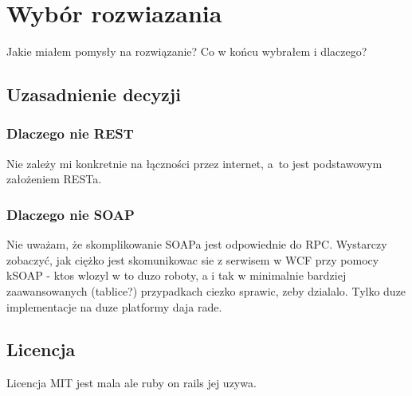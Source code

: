 \section{Wybór rozwiazania}
Jakie miałem pomysły na rozwiązanie? Co w końcu wybrałem i dlaczego?

\subsection{Uzasadnienie decyzji}
\subsubsection{Dlaczego nie REST}
Nie zależy mi konkretnie na łączności przez internet, a~to jest podstawowym założeniem RESTa.

\subsubsection{Dlaczego nie SOAP}
Nie uważam, że skomplikowanie SOAPa jest odpowiednie do RPC. Wystarczy zobaczyć, jak ciężko jest skomunikowac sie z serwisem w WCF przy pomocy kSOAP - ktos wlozyl w to duzo roboty, a i tak w minimalnie bardziej zaawansowanych (tablice?) przypadkach ciezko sprawic, zeby dzialalo. Tylko duze implementacje na duze platformy daja rade.

\subsection{Licencja}
Licencja MIT jest mala ale ruby on rails jej uzywa.

%
%
%
%

